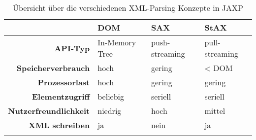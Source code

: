 \begin{table}[hb]
    \begin{longtable}[c]{r l l l}
        \toprule
        \rowcolor{lightgray}
        & \textbf{DOM}   & \textbf{SAX}   & \textbf{StAX} \\
        \midrule
        \textbf{API-Typ}                    & In-Memory Tree    & push-streaming    & pull-streaming\\
        \textbf{Speicherverbrauch}          & hoch              & gering            & \textless{} DOM\\
        \textbf{Prozessorlast}              & hoch              & gering            & gering \\
        \textbf{Elementzugriff}             & beliebig          & seriell           & seriell \\
        \textbf{Nutzerfreundlichkeit}       & niedrig           & hoch              & mittel \\
        \textbf{XML schreiben}              & ja                & nein              & ja \\
        \bottomrule
        \caption{Übersicht über die verschiedenen XML-Parsing Konzepte in JAXP}
        \label{tab:xmlParsingModels}
    \end{longtable}
\end{table}
